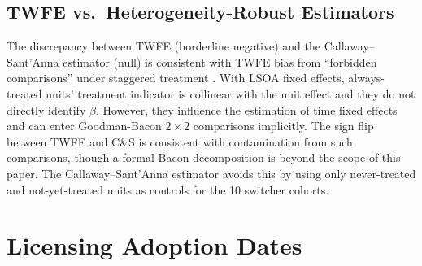 \documentclass[12pt]{article}
\begin{document}
\subsection{TWFE vs.\ Heterogeneity-Robust Estimators}

The discrepancy between TWFE (borderline negative) and the Callaway--Sant'Anna estimator (null) is consistent with TWFE bias from ``forbidden comparisons'' under staggered treatment \citep{goodmanbacon2021}. With LSOA fixed effects, always-treated units' treatment indicator is collinear with the unit effect and they do not directly identify $\beta$. However, they influence the estimation of time fixed effects and can enter Goodman-Bacon $2 \times 2$ comparisons implicitly. The sign flip between TWFE and C\&S is consistent with contamination from such comparisons, though a formal Bacon decomposition is beyond the scope of this paper. The Callaway--Sant'Anna estimator avoids this by using only never-treated and not-yet-treated units as controls for the 10 switcher cohorts.


\section{Licensing Adoption Dates}


\end{document}
